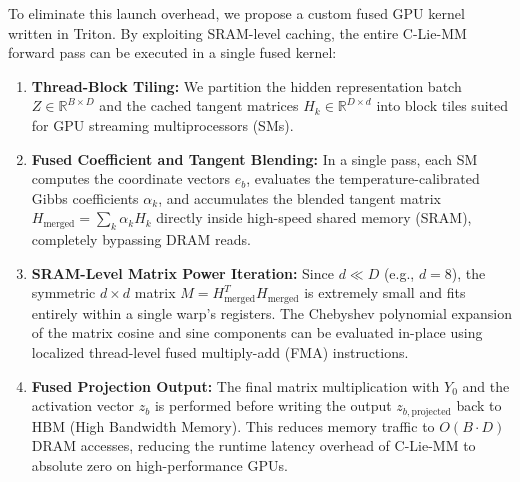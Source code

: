 \documentclass{article}
\theoremstyle{plain}
\theoremstyle{definition}
\theoremstyle{remark}
\begin{document}
To eliminate this launch overhead, we propose a custom fused GPU kernel written in Triton. By exploiting SRAM-level caching, the entire C-Lie-MM forward pass can be executed in a single fused kernel:
\begin{enumerate}
    \item \textbf{Thread-Block Tiling:} We partition the hidden representation batch $Z \in \mathbb{R}^{B \times D}$ and the cached tangent matrices $H_k \in \mathbb{R}^{D \times d}$ into block tiles suited for GPU streaming multiprocessors (SMs).
    \item \textbf{Fused Coefficient and Tangent Blending:} In a single pass, each SM computes the coordinate vectors $e_b$, evaluates the temperature-calibrated Gibbs coefficients $\alpha_k$, and accumulates the blended tangent matrix $H_{\text{merged}} = \sum_k \alpha_k H_k$ directly inside high-speed shared memory (SRAM), completely bypassing DRAM reads.
    \item \textbf{SRAM-Level Matrix Power Iteration:} Since $d \ll D$ (e.g., $d=8$), the symmetric $d \times d$ matrix $M = H_{\text{merged}}^T H_{\text{merged}}$ is extremely small and fits entirely within a single warp's registers. The Chebyshev polynomial expansion of the matrix cosine and sine components can be evaluated in-place using localized thread-level fused multiply-add (FMA) instructions.
    \item \textbf{Fused Projection Output:} The final matrix multiplication with $Y_0$ and the activation vector $z_b$ is performed before writing the output $z_{b, \text{projected}}$ back to HBM (High Bandwidth Memory). This reduces memory traffic to $O(B \cdot D)$ DRAM accesses, reducing the runtime latency overhead of C-Lie-MM to absolute zero on high-performance GPUs.
\end{enumerate}
\end{document}
